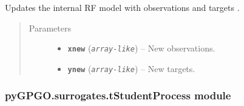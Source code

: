 \documentclass[letterpaper,10pt,english]{sphinxmanual}
\begin{document}
\begin{fulllineitems}

\begin{fulllineitems}
\label{pyGPGO.surrogates.RandomForest:pyGPGO.surrogates.RandomForest.RandomForest.update}
Updates the internal RF model with observations  and targets .
\begin{quote}\begin{description}
\item[{Parameters}] \leavevmode\begin{itemize}
\item {} 
\textbf{\texttt{xnew}} (\emph{\texttt{array-like}}) -- New observations.

\item {} 
\textbf{\texttt{ynew}} (\emph{\texttt{array-like}}) -- New targets.

\end{itemize}

\end{description}\end{quote}

\end{fulllineitems}


\end{fulllineitems}



\subsubsection{pyGPGO.surrogates.tStudentProcess module}
\label{pyGPGO.surrogates.tStudentProcess:pygpgo-surrogates-tstudentprocess-module}\label{pyGPGO.surrogates.tStudentProcess:module-pyGPGO.surrogates.tStudentProcess}\label{pyGPGO.surrogates.tStudentProcess::doc}
\end{document}
